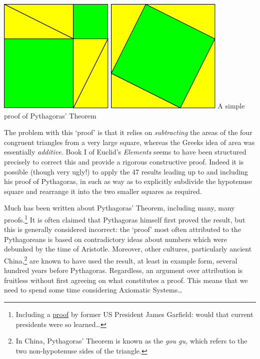 \begin{center}
\includegraphics[width=0.3\linewidth]{pythag}
\qquad\qquad\qquad\qquad
\includegraphics[width=0.3\linewidth]{pythag2}\medbreak
A simple proof of Pythagoras' Theorem
\end{center}
The problem with this `proof' is that it relies on \emph{subtracting} the areas of the four congruent triangles from a very large square, whereas the Greeks idea of area was essentially \emph{additive.} Book I of Euclid's \emph{Elements} seems to have been structured precisely to correct this and provide a rigorous constructive proof. Indeed it is possible (though very ugly!) to apply the 47 results leading up to and including his proof of Pythagoras, in such as way as to explicitly subdivide the hypotenuse square and rearrange it into the two smaller squares as required.\smallbreak


Much has been written about Pythagoras' Theorem, including many, many proofs.\footnote{Including a \href{https://www.maa.org/press/periodicals/convergence/mathematical-treasure-james-a-garfields-proof-of-the-pythagorean-theorem}{proof} by former US President James Garfield: would that current presidents were so learned\ldots} It is often claimed that Pythagoras himself first proved the result, but this is generally considered incorrect: the `proof' most often attributed to the Pythagoreans is based on contradictory ideas about numbers which were debunked by the time of Aristotle. Moreover, other cultures, particularly ancient China,\footnote{In China, Pythagoras' Theorem is known as the \emph{gou gu,} which refers to the two non-hypotenuse sides of the triangle.} are known to have used the result, at least in example form, several hundred years before Pythagoras. Regardless, an argument over attribution is fruitless without first agreeing on what constitutes a proof. This means that we need to spend some time considering Axiomatic Systems\ldots 


